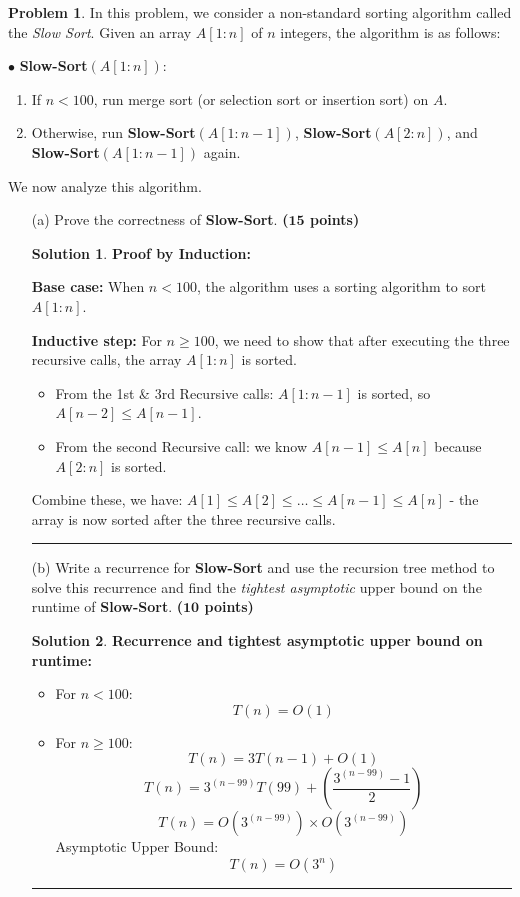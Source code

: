 \documentclass{article}
\theoremstyle{definition}
\newtheorem{problem}{Problem}
\def\fline{\rule{0.75\linewidth}{0.5pt}}
\newcommand{\finishline}{\begin{center}\fline\end{center}}
\newtheorem*{solution*}{Solution}
\newenvironment{solution}{\begin{solution*}}{{\finishline} \end{solution*}}
\newcommand{\grade}[1]{\hfill{\textbf{($\mathbf{#1}$ points)}}}
\begin{document}
\begin{problem}
	In this problem, we consider a non-standard sorting algorithm called the \emph{Slow Sort}. Given an array $A[1:n]$ of $n$ integers, the algorithm is as follows: 
	
	$\bullet$ \textbf{Slow-Sort}$(A[1:n])$:
	\begin{enumerate}
		\item If $n < 100$, run merge sort (or selection sort or insertion sort) on $A$.  
		\item Otherwise, run \textbf{Slow-Sort}$(A[1:n-1])$, \textbf{Slow-Sort}$(A[2:n])$, and \textbf{Slow-Sort}$(A[1:n-1])$ again. 
	\end{enumerate} 
	
	We now analyze this algorithm. 
	
	
	\begin{enumerate}
		\item [(a)] Prove the correctness of  \textbf{Slow-Sort}. \grade{15} 
		
		\begin{solution}
			\textbf{Proof by Induction:}

			\textbf{Base case:} When $n < 100$, the algorithm uses a sorting algorithm to sort $A[1:n]$.
			
			\textbf{Inductive step:} For $n \geq 100$, we need to show that after executing the three recursive calls, the array $A[1:n]$ is sorted.
			\begin{itemize}
				\item From the 1st \& 3rd Recursive calls: $A[1:n-1]$ is sorted, so $A[n-2] \leq A[n-1]$.
				\item From the second Recursive call: we know $A[n-1] \leq A[n]$ because $A[2:n]$ is sorted.
			\end{itemize}
			Combine these, we have: $A[1] \leq A[2] \leq \ldots \leq A[n-1] \leq A[n]$ - the array is now sorted after the three recursive calls. 
		\end{solution}

			\item [(b)] Write a recurrence for  \textbf{Slow-Sort} and use the recursion tree method to solve this recurrence and find the \emph{tightest asymptotic} upper bound on the runtime of \textbf{Slow-Sort}. \grade{10}
	
		\begin{solution}
			\textbf{Recurrence and tightest asymptotic upper bound on runtime:}
			\begin{itemize}
				\item For $n < 100$:
				\[
				T(n) = O(1)
				\]
				\item For $n \geq 100$:
				\[
				T(n) = 3T(n-1) + O(1)
				\]
				\[
				T(n) = 3^{(n-99)} T(99) + \left(\frac{3^{(n-99)} - 1}{2}\right)
				\]
				\[
				T(n) = O(3^{(n-99)}) \times O(3^{(n-99)})
				\]
				Asymptotic Upper Bound:
				\[
				T(n) = O(3^n)
				\]
			\end{itemize}
		\end{solution}

	\end{enumerate}
\end{problem}
\end{document}
